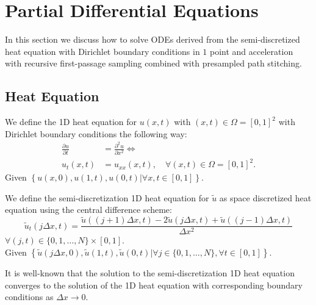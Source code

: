 \documentclass[a4paper,12pt]{article}
\begin{document}
\section{Partial Differential Equations}

In this section we discuss how to solve ODEs derived from the semi-discretized heat equation
with Dirichlet boundary conditions in $1$ point and acceleration with recursive first-passage sampling
combined with presampled path stitching.

\subsection{Heat Equation}
\begin{definition} \label{def:heat equation square}
  We define the 1D heat equation for $u(x,t)$ with $ (x,t) \in \Omega = [0,1]^2$
  with Dirichlet boundary conditions the following way:
  \begin{align}
    \frac{\partial u}{\partial t} & = \frac{\partial^{2} u}{\partial x^{2}}  \Leftrightarrow   \\
    u_t(x,t)                      & = u_{xx}(x,t), \quad \forall (x,t) \in \Omega = [0,1]^2  .
  \end{align}
  Given $\left\{u(x,0),u(1,t),u(0,t) | \forall x,t \in [0,1]  \right\} $.
\end{definition}

\begin{definition} \label{def:discrete heat equation square}
  We define the semi-discretization 1D heat equation for $\tilde{u}$ as space discretized heat equation
  using the central difference scheme:
  \begin{equation}
    \tilde{u}_t(j \Delta x,t)  = \frac{\tilde{u}((j+1) \Delta x, t)-2\tilde{u}(j \Delta x, t)+\tilde{u}((j-1) \Delta x, t)}{\Delta x^{2}}
  \end{equation}
  $\forall (j,t) \in \{0, 1, \ldots, N\} \times [0,1]$. \\
  Given $\left\{\tilde{u}(j \Delta x,0),\tilde{u}(1,t),\tilde{u}(0,t) | \forall j \in \{0, 1, \ldots, N\}, \forall t \in  [0,1]  \right\} $.

  It is well-known that the solution to the semi-discretization 1D heat equation converges to the solution of the 1D heat equation with
  corresponding boundary conditions as $\Delta x \rightarrow 0$.
\end{definition}
\end{document}
